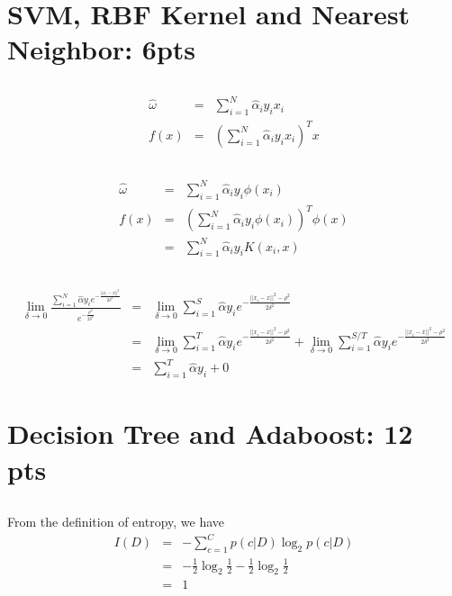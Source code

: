 \documentclass[12pt]{article}
\begin{document}
\section{SVM, RBF Kernel and Nearest Neighbor: 6pts}
\subsection{}
\begin{eqnarray}
    \hat{\omega} &=& \sum_{i=1}^N \hat{\alpha}_iy_ix_i \nonumber\\
    f(x) &=& (\sum_{i=1}^N \hat{\alpha}_iy_ix_i)^T x \nonumber
\end{eqnarray}

\subsection{}
\begin{eqnarray}
    \hat{\omega} &=& \sum_{i=1}^N \hat{\alpha}_iy_i\phi(x_i) \nonumber \\
    f(x) &=& (\sum_{i=1}^N \hat{\alpha}_iy_i\phi(x_i))^T \phi(x) \nonumber \\ 
        &=& \sum_{i=1}^N \hat{\alpha}_iy_iK(x_i, x) \nonumber
\end{eqnarray}

\subsection{}
\begin{eqnarray}
    \lim_{\delta \to 0} \frac{\sum_{i=1}^{N}{\hat{\alpha}y_ie^{-\frac{||x_i-x||^{2}}{2\delta^{2}}}}}{e^{-\frac{\rho ^2}{2\delta^{2}}}}
    &=& \lim_{\delta \to 0} \sum_{i=1}^{S}{\hat{\alpha}y_ie^{-\frac{||x_i-x||^{2} - \rho ^2}{2\delta^{2}}}} \nonumber \\
    &=& \lim_{\delta \to 0} \sum_{i=1}^{T}{\hat{\alpha}y_ie^{-\frac{||x_i - x||^{2} - \rho^2}{2\delta^2}}} 
    +  \lim_{\delta \to 0} \sum_{i=1}^{S/T}{\hat{\alpha}y_ie^{-\frac{||x_i - x||^{2} - \rho^2}{2\delta^2}}} \nonumber \\
    &=& \sum_{i=1}^{T}{\hat{\alpha}y_i + 0} \nonumber 
\end{eqnarray}

\newpage

\section{Decision Tree and Adaboost: 12 pts}
\subsection{}
From the definition of entropy, we have
\begin{eqnarray}
    I(D) &=& -\sum_{c=1}^C p(c|D)\log_2p(c|D) \nonumber \\
    &=& -\frac{1}{2}\log_2\frac{1}{2} - \frac{1}{2}\log_2\frac{1}{2} \nonumber \\
    &=& 1 \nonumber
\end{eqnarray}
\end{document}
